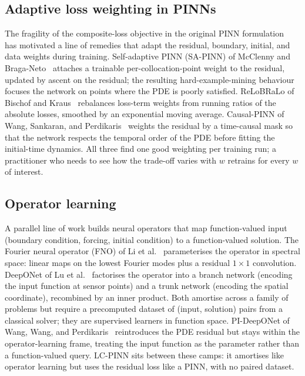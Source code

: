 \documentclass[12pt,a4paper]{extarticle}
\begin{document}
\subsection{Adaptive loss weighting in PINNs}

The fragility of the composite-loss objective in the original PINN formulation~\cite{raissi2019physics} has motivated a line of remedies that adapt the residual, boundary, initial, and data weights during training. Self-adaptive PINN (SA-PINN) of McClenny and Braga-Neto~\cite{mcclenny2020sapinn} attaches a trainable per-collocation-point weight to the residual, updated by ascent on the residual; the resulting hard-example-mining behaviour focuses the network on points where the PDE is poorly satisfied. ReLoBRaLo of Bischof and Kraus~\cite{bischof2021relobralo} rebalances loss-term weights from running ratios of the absolute losses, smoothed by an exponential moving average. Causal-PINN of Wang, Sankaran, and Perdikaris~\cite{wang2024causal} weights the residual by a time-causal mask so that the network respects the temporal order of the PDE before fitting the initial-time dynamics. All three find one good weighting per training run; a practitioner who needs to see how the trade-off varies with $w$ retrains for every $w$ of interest.

\subsection{Operator learning}

A parallel line of work builds neural operators that map function-valued input (boundary condition, forcing, initial condition) to a function-valued solution. The Fourier neural operator (FNO) of Li et al.~\cite{li2020fourier} parameterises the operator in spectral space: linear maps on the lowest Fourier modes plus a residual $1 \times 1$ convolution. DeepONet of Lu et al.~\cite{lu2021learning} factorises the operator into a branch network (encoding the input function at sensor points) and a trunk network (encoding the spatial coordinate), recombined by an inner product. Both amortise across a family of problems but require a precomputed dataset of (input, solution) pairs from a classical solver; they are supervised learners in function space. PI-DeepONet of Wang, Wang, and Perdikaris~\cite{wang2021pi-deeponet} reintroduces the PDE residual but stays within the operator-learning frame, treating the input function as the parameter rather than a function-valued query. LC-PINN sits between these camps: it amortises like operator learning but uses the residual loss like a PINN, with no paired dataset.
\end{document}
